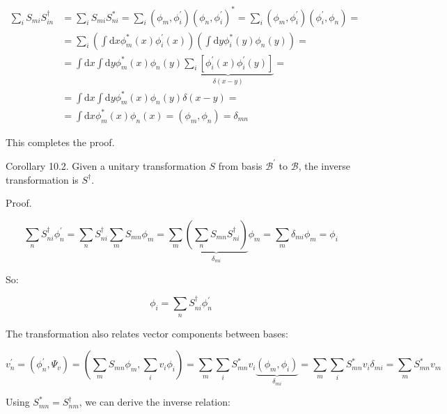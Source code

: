 \documentclass[10pt]{article}
\begin{document}
\begin{align*}
\sum_{i} S_{m i} S_{i n}^{\dagger} & =\sum_{i} S_{m i} S_{n i}^{*}=\sum_{i}\left(\phi_{m}, \phi_{i}^{\prime}\right)\left(\phi_{n}, \phi_{i}^{\prime}\right)^{*}=\sum_{i}\left(\phi_{m}, \phi_{i}^{\prime}\right)\left(\phi_{i}^{\prime}, \phi_{n}\right)= \\
& =\sum_{i}\left(\int \mathrm{d} x \phi_{m}^{*}(x) \phi_{i}^{\prime}(x)\right)\left(\int \mathrm{d} y \phi_{i}^{*}(y) \phi_{n}(y)\right)= \\
& =\int \mathrm{d} x \int \mathrm{d} y \phi_{m}^{*}(x) \phi_{n}(y) \underbrace{\sum_{i}\left[\phi_{i}^{\prime}(x) \phi_{i}^{\prime}(y)\right]}_{\delta(x-y)}= \\
& =\int \mathrm{d} x \int \mathrm{d} y \phi_{m}^{*}(x) \phi_{n}(y) \delta(x-y)= \\
& =\int \mathrm{d} x \phi_{m}^{*}(x) \phi_{n}(x)=\left(\phi_{m}, \phi_{n}\right)=\delta_{m n} \tag{10.14}
\end{align*}

This completes the proof.

Corollary 10.2. Given a unitary transformation $S$ from basis $\mathcal{B}^{\prime}$ to $\mathcal{B}$, the inverse transformation is $S^{\dagger}$.

Proof.

\begin{equation*}
\sum_{n} S_{n i}^{\dagger} \phi_{n}^{\prime}=\sum_{n} S_{n i}^{\dagger} \sum_{m} S_{m n} \phi_{m}=\sum_{m} \underbrace{\left(\sum_{n} S_{m n} S_{n i}^{\dagger}\right)}_{\delta_{m i}} \phi_{m}=\sum_{m} \delta_{m i} \phi_{m}=\phi_{i} \tag{10.15}
\end{equation*}


So:

\begin{equation*}
\phi_{i}=\sum_{n} S_{n i}^{\dagger} \phi_{n}^{\prime} \tag{10.16}
\end{equation*}

The transformation also relates vector components between bases:

\begin{equation*}
v_{n}^{\prime}=\left(\phi_{n}^{\prime}, \Psi_{v}\right)=\left(\sum_{m} S_{m n} \phi_{m}, \sum_{i} v_{i} \phi_{i}\right)=\sum_{m} \sum_{i} S_{m n}^{*} v_{i} \underbrace{\left(\phi_{m}, \phi_{i}\right)}_{\delta_{m i}}=\sum_{m} \sum_{i} S_{m n}^{*} v_{i} \delta_{m i}=\sum_{m} S_{m n}^{*} v_{m} \tag{10.17}
\end{equation*}

Using $S_{m n}^{*}=S_{n m}^{\dagger}$, we can derive the inverse relation:
\end{document}
